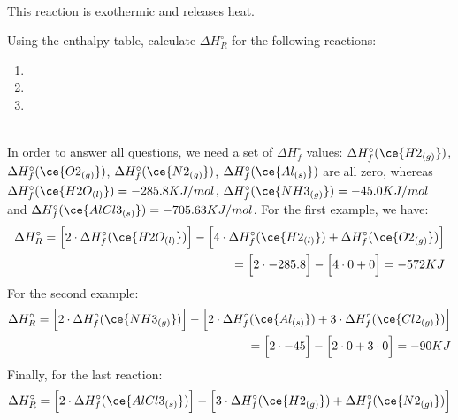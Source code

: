 \documentclass[main.tex]{subfiles}
\begin{document}
\begin{description}
\begin{equation*}
\begin{split}
\end{split}\end{equation*}
This reaction is exothermic and releases heat.
\begin{example} %
Using the enthalpy table, calculate $\Delta H^{\circ}_R$ for the following reactions: 
\begin{enumerate}[label=(\alph*)]
\item {}
\item {}
\item {}
\end{enumerate}
\\
In order to answer all questions, we need a set of $\Delta H^{\circ}_f$ values: $\Delta H^{\circ}_f(\ce{H2_{(g)}})$, $\Delta H^{\circ}_f(\ce{O2_{(g)}})$, $\Delta H^{\circ}_f(\ce{N2_{(g)}})$, $\Delta H^{\circ}_f(\ce{Al_{(s)}})$ are all zero, whereas $\Delta H^{\circ}_f(\ce{H2O_{(l)}})=-285.8KJ/mol$, $\Delta H^{\circ}_f(\ce{NH3_{(g)}})=-45.0KJ/mol$ and $\Delta H^{\circ}_f(\ce{AlCl3_{(s)}})=-705.63KJ/mol$. For the first example, we have:
\begin{equation*}\begin{split}
  \Delta H^{\circ}_R= \Big[2\cdot \Delta H_f^{\circ}(\ce{H2O_{(l)}})    \Big]-\Big[4\cdot \Delta H_f^{\circ}(\ce{H2_{(l)}})+ \Delta H_f^{\circ}(\ce{O2_{(g)}}) \Big]      \\
  =     \Big[2\cdot -285.8  \Big]-\Big[ 4\cdot 0+0 \Big]= -572KJ
\end{split}\end{equation*}
For the second example:
\begin{equation*}\begin{split}
  \Delta H^{\circ}_R= \Big[2\cdot \Delta H_f^{\circ}(\ce{NH3_{(g)}})    \Big]-\Big[2\cdot \Delta H_f^{\circ}(\ce{Al_{(s)}})+ 3\cdot \Delta H_f^{\circ}(\ce{Cl2_{(g)}}) \Big]      \\
  =     \Big[2\cdot -45 \Big]-\Big[2\cdot 0+3\cdot0 \Big]= -90KJ
\end{split}\end{equation*}
Finally, for the last reaction:
\begin{equation*}\begin{split}
  \Delta H^{\circ}_R= \Big[2\cdot \Delta H_f^{\circ}(\ce{AlCl3_{(s)}})    \Big]-\Big[3\cdot \Delta H_f^{\circ}(\ce{H2_{(g)}})+ \Delta H_f^{\circ}(\ce{N2_{(g)}}) \Big]      \\

\end{split}
\end{equation*}
\end{example}
\end{description}
\end{document}
